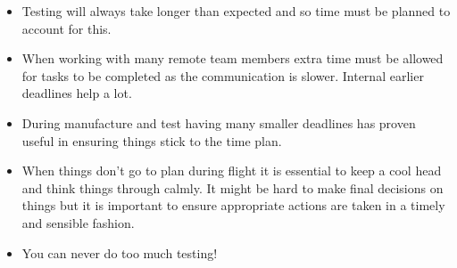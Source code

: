 \begin{itemize}
    \item Testing will always take longer than expected and so time must be planned to account for this.
    \item When working with many remote team members extra time must be allowed for tasks to be completed as the communication is slower. Internal earlier deadlines help a lot.
    \item During manufacture and test having many smaller deadlines has proven useful in ensuring things stick to the time plan.
    \item When things don't go to plan during flight it is essential to keep a cool head and think things through calmly. It might be hard to make final decisions on things but it is important to ensure appropriate actions are taken in a timely and sensible fashion.
    \item You can never do too much testing!
\end{itemize}

